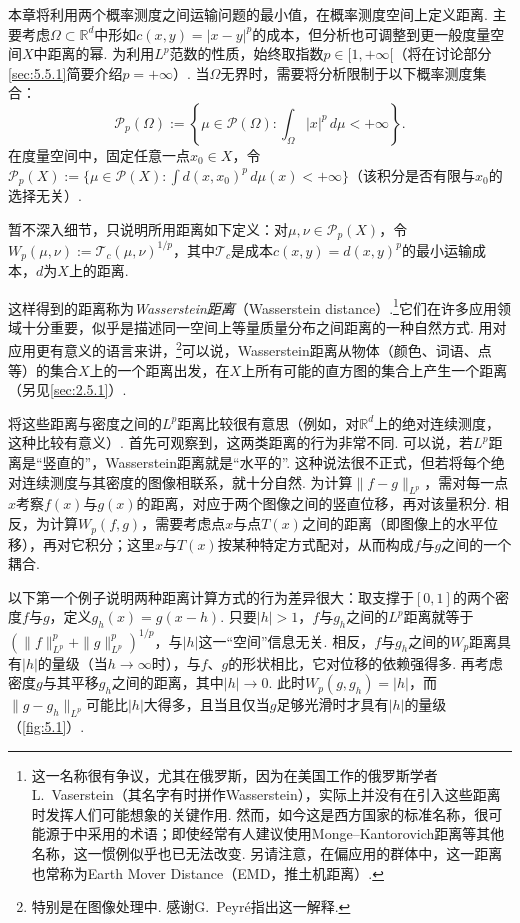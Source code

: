 本章将利用两个概率测度之间运输问题的最小值，在概率测度空间上定义距离. 主要考虑$\Omega\subset\mathbb R^d$中形如$c(x,y)=|x-y|^p$的成本，但分析也可调整到更一般度量空间$X$中距离的幂. 为利用$L^p$范数的性质，始终取指数$p\in[1,+\infty[$（将在讨论部分\autoref{sec:5.5.1}简要介绍$p=+\infty$）. 当$\Omega$无界时，需要将分析限制于以下概率测度集合：
\[
\mathscr P_p(\Omega):=\left\{\mu\in\mathscr P(\Omega):\int_\Omega|x|^p\,d\mu<+\infty\right\}.
\]
在度量空间中，固定任意一点$x_0\in X$，令$\mathscr P_p(X):=\{\mu\in\mathscr P(X):\int d(x,x_0)^p\,d\mu(x)<+\infty\}$（该积分是否有限与$x_0$的选择无关）.

暂不深入细节，只说明所用距离如下定义：对$\mu,\nu\in\mathscr P_p(X)$，令$W_p(\mu,\nu):=\mathscr T_c(\mu,\nu)^{1/p}$，其中$\mathscr T_c$是成本$c(x,y)=d(x,y)^p$的最小运输成本，$d$为$X$上的距离.

这样得到的距离称为\emph{Wasserstein距离}（Wasserstein distance）.\footnote{这一名称很有争议，尤其在俄罗斯，因为在美国工作的俄罗斯学者L.~Vaserstein（其名字有时拼作Wasserstein），实际上并没有在引入这些距离时发挥人们可能想象的关键作用. 然而，如今这是西方国家的标准名称，很可能源于\cite{b198,b246}中采用的术语；即使经常有人建议使用Monge--Kantorovich距离等其他名称，这一惯例似乎也已无法改变. \label{idx:root5-p177-emd}另请注意，在偏应用的群体中，这一距离也常称为Earth Mover Distance（EMD，推土机距离）.}它们在许多应用领域十分重要，似乎是描述同一空间上等量质量分布之间距离的一种自然方式. 用对应用更有意义的语言来讲，\footnote{特别是在图像处理中. 感谢G.~Peyré指出这一解释.}可以说，Wasserstein距离从物体（颜色、词语、点等）的集合$X$上的一个距离出发，在$X$上所有可能的直方图的集合上产生一个距离（另见\autoref{sec:2.5.1}）.

将这些距离与密度之间的$L^p$距离比较很有意思（例如，对$\mathbb R^d$上的绝对连续测度，这种比较有意义）. 首先可观察到，这两类距离的行为非常不同. 可以说，若$L^p$距离是“竖直的”，Wasserstein距离就是“水平的”. 这种说法很不正式，但若将每个绝对连续测度与其密度的图像相联系，就十分自然. 为计算$\|f-g\|_{L^p}$，需对每一点$x$考察$f(x)$与$g(x)$的距离，对应于两个图像之间的竖直位移，再对该量积分. 相反，为计算$W_p(f,g)$，需要考虑点$x$与点$T(x)$之间的距离（即图像上的水平位移），再对它积分；这里$x$与$T(x)$按某种特定方式配对，从而构成$f$与$g$之间的一个耦合.

以下第一个例子说明两种距离计算方式的行为差异很大：取支撑于$[0,1]$的两个密度$f$与$g$，定义$g_h(x)=g(x-h)$. 只要$|h|>1$，$f$与$g_h$之间的$L^p$距离就等于$(\|f\|_{L^p}^p+\|g\|_{L^p}^p)^{1/p}$，与$|h|$这一“空间”信息无关. 相反，$f$与$g_h$之间的$W_p$距离具有$|h|$的量级（当$h\to\infty$时），与$f$、$g$的形状相比，它对位移的依赖强得多. 再考虑密度$g$与其平移$g_h$之间的距离，其中$|h|\to0$. 此时$W_p(g,g_h)=|h|$，而$\|g-g_h\|_{L^p}$可能比$|h|$大得多，且当且仅当$g$足够光滑时才具有$|h|$的量级（\autoref{fig:5.1}）.

